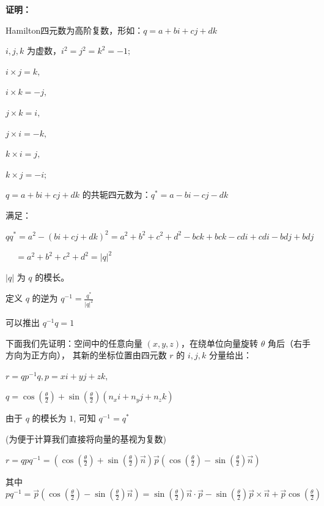 \documentclass[withoutpreface,bwprint]{cumcmthesis} %
\begin{document}
\noindent\textbf{证明：}

Hamilton四元数为高阶复数，形如：$q=a+bi+cj+dk$ \par
$i,j,k$ 为虚数，$i^2=j^2=k^2=-1;$ \par
$i \times j=k,$ \par
$i \times k=-j,$ \par
$j \times k=i,$ \par
$j \times i=-k,$ \par
$k \times i=j,$ \par
$k \times j=-i;$ \par
$q=a+bi+cj+dk$ 的共轭四元数为：$q^*=a-bi-cj-dk$ \par
满足：\par
$qq^*=a^2-(bi+cj+dk)^2=a^2+b^2+c^2+d^2-bck+bck-cdi+cdi-bdj+bdj$ \par
\quad\ \ \,$=a^2+b^2+c^2+d^2=|q|^2$ \par
$|q|$ 为 $q$ 的模长。\par
定义 $q$ 的逆为 $q^{-1}=\frac{\displaystyle q^*}{\displaystyle |q|^2}$ \par
可以推出 $q^{-1}q=1$ \par
下面我们先证明：空间中的任意向量 $( x ,y ,z )$，在绕单位向量旋转 $\theta $ 角后（右手方向为正方向），
其新的坐标位置由四元数 $r$ 的 $i , j , k$ 分量给出：\par
$r=qp^{-1}q,p=xi+yj+zk,$ \par
$q = \cos(\frac{\theta }{2}) + \sin(\frac{\theta }{2})(n_xi + 
    n_yj + n_zk)$ \par
由于 $q$ 的模长为 $1$, 可知 $q^{-1}=q^*$ \par
(为便于计算我们直接将向量的基视为复数) \par
$r = qpq^{-1} = (\cos(\frac{\theta}{2}) + 
\sin(\frac{\theta}{2})\overrightarrow{n})\overrightarrow{p} 
(\cos(\frac{\theta}{2}) - \sin(\frac{\theta}{2})
\overrightarrow{n})$ \par
其中 $pq^{-1} = \overrightarrow{p} (\cos(\frac{\theta}{2}) - 
\sin(\frac{\theta}{2})\overrightarrow{n}) = 
\sin(\frac{\theta}{2})\overrightarrow{n} \cdot \overrightarrow{p} -
\sin(\frac{\theta}{2})\overrightarrow{p} \times \overrightarrow{n} +
\overrightarrow{p} \cos(\frac{\theta}{2})$
\end{document}
